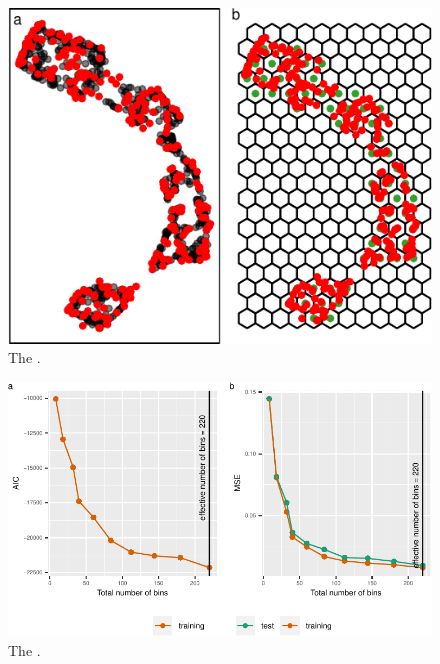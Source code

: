 \documentclass[
  12pt]{article}
\begin{document}
\begin{figure}

{\centering \includegraphics{paper_files/figure-pdf/fig-predict-1.pdf}

}

\caption{\label{fig-predict}The .}

\end{figure}

\begin{figure}

{\centering \includegraphics[width=1\textwidth,height=\textheight]{paper_files/figure-pdf/fig-diagnosticplt-1.pdf}

}

\caption{\label{fig-diagnosticplt}The .}

\end{figure}
\end{document}

